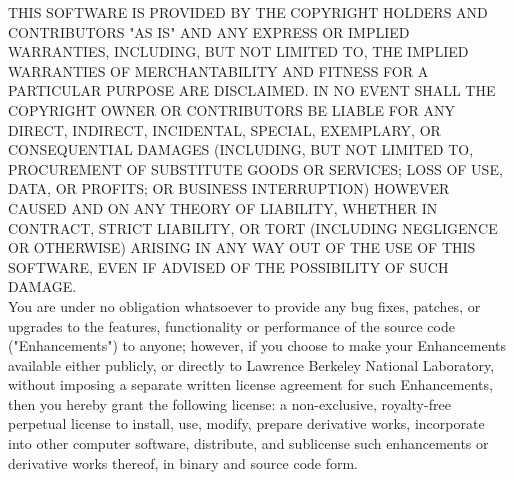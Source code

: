 \documentclass{article}
\begin{document}
THIS SOFTWARE IS PROVIDED BY THE COPYRIGHT HOLDERS AND CONTRIBUTORS
"AS IS" AND ANY EXPRESS OR IMPLIED WARRANTIES, INCLUDING, BUT NOT
LIMITED TO, THE IMPLIED WARRANTIES OF MERCHANTABILITY AND FITNESS
FOR A PARTICULAR PURPOSE ARE DISCLAIMED. IN NO EVENT SHALL THE
COPYRIGHT OWNER OR CONTRIBUTORS BE LIABLE FOR ANY DIRECT, INDIRECT,
INCIDENTAL, SPECIAL, EXEMPLARY, OR CONSEQUENTIAL DAMAGES (INCLUDING,
BUT NOT LIMITED TO, PROCUREMENT OF SUBSTITUTE GOODS OR SERVICES;
LOSS OF USE, DATA, OR PROFITS; OR BUSINESS INTERRUPTION) HOWEVER
CAUSED AND ON ANY THEORY OF LIABILITY, WHETHER IN CONTRACT, STRICT
LIABILITY, OR TORT (INCLUDING NEGLIGENCE OR OTHERWISE) ARISING IN
ANY WAY OUT OF THE USE OF THIS SOFTWARE, EVEN IF ADVISED OF THE
POSSIBILITY OF SUCH DAMAGE.\\

You are under no obligation whatsoever to provide any bug fixes,
patches, or upgrades to the features, functionality or performance
of the source code ("Enhancements") to anyone; however, if you
choose to make your Enhancements available either publicly, or
directly to Lawrence Berkeley National Laboratory, without imposing
a separate written license agreement for such Enhancements, then you
hereby grant the following license: a non-exclusive, royalty-free
perpetual license to install, use, modify, prepare derivative works,
incorporate into other computer software, distribute, and sublicense
such enhancements or derivative works thereof, in binary and source
code form.



\end{document}
